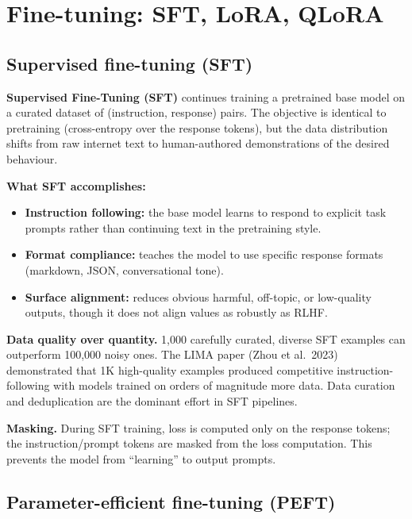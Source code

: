 
\section{Fine-tuning: SFT, LoRA, QLoRA}

\subsection{Supervised fine-tuning (SFT)}

\textbf{Supervised Fine-Tuning (SFT)} continues training a pretrained base model on a
curated dataset of (instruction, response) pairs. The objective is identical to
pretraining (cross-entropy over the response tokens), but the data distribution shifts
from raw internet text to human-authored demonstrations of the desired behaviour.

\textbf{What SFT accomplishes:}
\begin{itemize}
  \item \textbf{Instruction following:} the base model learns to respond to explicit
    task prompts rather than continuing text in the pretraining style.
  \item \textbf{Format compliance:} teaches the model to use specific response
    formats (markdown, JSON, conversational tone).
  \item \textbf{Surface alignment:} reduces obvious harmful, off-topic, or low-quality
    outputs, though it does not align values as robustly as RLHF.
\end{itemize}

\textbf{Data quality over quantity.} 1,000 carefully curated, diverse SFT examples
can outperform 100,000 noisy ones. The LIMA paper (Zhou et al.\ 2023) demonstrated
that 1K high-quality examples produced competitive instruction-following with models
trained on orders of magnitude more data. Data curation and deduplication are the
dominant effort in SFT pipelines.

\textbf{Masking.} During SFT training, loss is computed only on the response tokens;
the instruction/prompt tokens are masked from the loss computation. This prevents the
model from ``learning'' to output prompts.

\subsection{Parameter-efficient fine-tuning (PEFT)}

